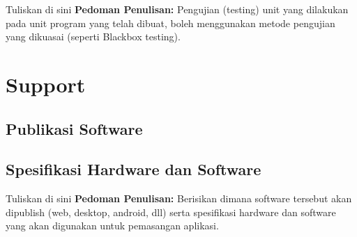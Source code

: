 Tuliskan di sini \textbf{Pedoman Penulisan:} Pengujian (testing) unit yang dilakukan pada unit program yang telah dibuat, boleh menggunakan metode pengujian yang dikuasai (seperti Blackbox testing).



\section{Support}
\subsection{Publikasi Software}
\subsection{Spesifikasi Hardware dan Software}


Tuliskan di sini \textbf{Pedoman Penulisan:} Berisikan dimana software tersebut akan dipublish (web, desktop, android, dll) serta spesifikasi hardware dan software yang akan digunakan untuk pemasangan aplikasi.


